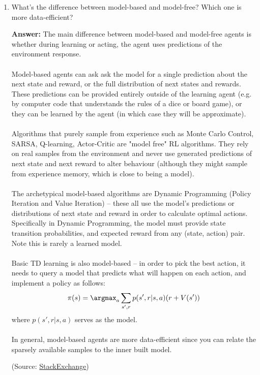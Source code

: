 \documentclass{article}
\newenvironment{QandA}{\begin{enumerate}[label=\arabic*.]}{\end{enumerate}}
\newenvironment{answer}{\par\normalfont \textbf{Answer:}}{}
\newcommand{\g}{\vert}
\begin{document}
\begin{QandA}
\begin{answer}
        (Source: \href{https://www.quora.com/What-are-the-benefits-of-using-off-policy-learning-over-on-policy-learning-in-reinforcement-learning}{Quora})
    \end{answer}

    \item What’s the difference between model-based and model-free? Which one is more data-efficient?
    \begin{answer}
        The main difference between model-based and model-free agents is whether during learning or acting, the agent uses predictions of the environment response. \\\\
        Model-based agents can ask ask the model for a single prediction about the next state and reward, or the full distribution of next states and rewards. These predictions can be provided entirely outside of the learning agent (e.g. by computer code that understands the rules of a dice or board game), or they can be learned by the agent (in which case they will be approximate).\\\\
        Algorithms that purely sample from experience such as Monte Carlo Control, SARSA, Q-learning, Actor-Critic are "model free" RL algorithms. They rely on real samples from the environment and never use generated predictions of next state and next reward to alter behaviour (although they might sample from experience memory, which is close to being a model).\\\\
        The archetypical model-based algorithms are Dynamic Programming (Policy Iteration and Value Iteration) -- these all use the model's predictions or distributions of next state and reward in order to calculate optimal actions. Specifically in Dynamic Programming, the model must provide state transition probabilities, and expected reward from any (state, action) pair. Note this is rarely a learned model. \\\\
        Basic TD learning is also model-based -- in order to pick the best action, it needs to query a model that predicts what will happen on each action, and implement a policy as follows:
        \begin{align*}
            \pi(s) = \argmax_{a} \sum_{s', r} p(s', r \g s, a) (r + V(s'))
        \end{align*}
        where $p(s', r \g s, a)$ serves as the model.\\\\
        In general, model-based agents are more data-efficient since you can relate the sparsely available samples to the inner built model. 
        
        (Source: \href{https://ai.stackexchange.com/questions/4456/whats-the-difference-between-model-free-and-model-based-reinforcement-learning}{StackExchange})
    \end{answer}
\end{QandA}
\end{document}

